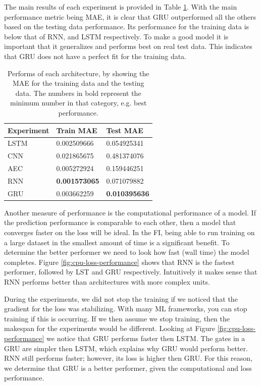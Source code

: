 \documentclass[11pt]{article}
\begin{document}
The main results of each experiment is provided in Table \ref{tab:mae-results}. With the main performance metric being MAE, it is clear that GRU outperformed all the others based on the testing data performance. Its performance for the training data is below that of RNN, and LSTM respectively. To make a good model it is important that it generalizes and performs best on real test data. This indicates that GRU does not have a perfect fit for the training data.

\begin{table}[]
\centering
\begin{tabular}{@{}lll@{}}
\toprule
Experiment & Train MAE   & Test MAE    \\ \midrule
LSTM       & 0.002509666 & 0.054925341 \\
CNN        & 0.021865675 & 0.481374076 \\
AEC        & 0.005272924 & 0.159446251 \\
RNN        & \textbf{0.001573065} & 0.071079882 \\
GRU        & 0.003662259 & \textbf{0.010395636} \\ \bottomrule
\end{tabular}
\caption{Performs of each architecture, by showing the MAE for the training data and the testing data. The numbers in bold represent the minimum number in that category, e.g. best performance. }
\label{tab:mae-results}
\end{table}

Another measure of performance is the computational performance of a model. If the prediction performance is comparable to each other, then a model that converges faster on the loss will be ideal. In the FI, being able to run training on a large dataset in the smallest amount of time is a significant benefit. To determine the better performer we need to look how fast (wall time) the model completes. Figure \ref{fig:cpu-loss-performance} shows that RNN is the fastest performer, followed by LST and GRU respectively. Intuitively it makes sense that RNN performs better than architectures with more complex units.

During the experiments, we did not stop the training if we noticed that the gradient for the loss was stabilizing. With many ML frameworks, you can stop training if this is occurring. If we then assume we stop training, then the makespan for the experiments would be different. Looking at Figure \ref{fig:cpu-loss-performance} we notice that GRU performs faster then LSTM. The gates in a GRU are simpler then LSTM, which explains why GRU would perform better. RNN still performs faster; however, its loss is higher then GRU. For this reason, we determine that GRU is a better performer, given the computational and loss performance.
\end{document}
